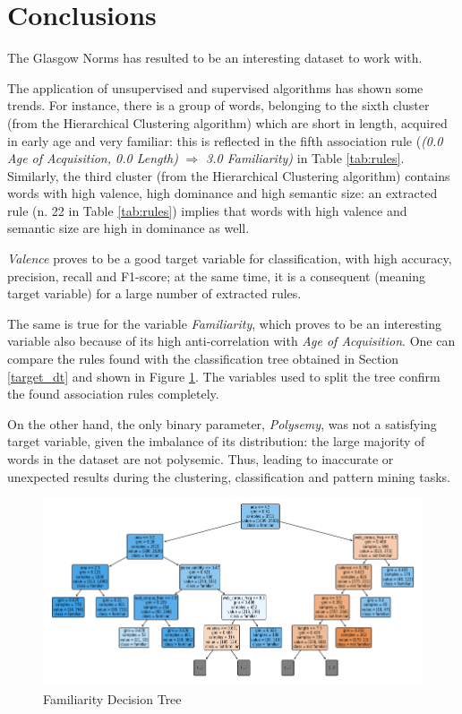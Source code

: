 \documentclass[a4paper,11pt,dvipsnames]{article}
\begin{document}


\section{Conclusions}

The Glasgow Norms has resulted to be an interesting dataset to work with.

The application of unsupervised and supervised algorithms has shown some trends. For instance, there is a group of words, belonging to the sixth cluster (from the Hierarchical Clustering algorithm) which are short in length, acquired in early age and very familiar: this is reflected in the fifth association rule (\textit{(0.0 Age of Acquisition, 0.0 Length)} $\Rightarrow$ \textit{3.0 Familiarity)}
in Table \ref{tab:rules}. Similarly, the third cluster (from the Hierarchical Clustering algorithm) contains words with high valence, high dominance and high semantic size: an extracted rule (n. 22 in Table \ref{tab:rules}) implies that words with high valence and semantic size are high in dominance as well. 

\textit{Valence} proves to be a good target variable for classification, with high accuracy, precision, recall and F1-score; at the same time, it is a consequent (meaning target variable) for a large number of extracted rules. 

The same is true for the variable \textit{Familiarity}, which proves to be an interesting variable also because of its high anti-correlation with \textit{Age of Acquisition}. One can compare the rules found with the classification tree obtained in Section \ref{target_dt} and shown in Figure \ref{fig:tree_fam}. The variables used to split the tree confirm the found association rules completely.

On the other hand, the only binary parameter, \textit{Polysemy}, was not a satisfying target variable, given the imbalance of its distribution: the large majority of words in the dataset are not polysemic. Thus, leading to inaccurate or unexpected results during the clustering, %
classification and pattern mining tasks.

\begin{figure}[h]
    \centering
    \includegraphics[width=\textwidth]{familiarity_tree.png}
    \caption{Familiarity Decision Tree}
    \label{fig:tree_fam}
\end{figure}

\nocite{*}
\printbibliography
\end{document}
